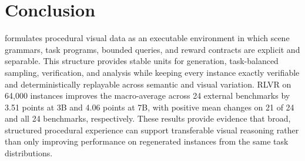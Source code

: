 \section{Conclusion}
\label{sec:conclusion}

\trace formulates procedural visual data as an executable environment in which
scene grammars, task programs, bounded queries, and reward contracts are explicit
and separable. This structure provides stable units for generation, task-balanced
sampling, verification, and analysis while keeping every instance exactly
verifiable and deterministically replayable across semantic and visual variation.
RLVR on 64,000 \trace instances improves the macro-average across 24 external
benchmarks by 3.51 points at 3B and 4.06 points at 7B, with positive mean changes
on 21 of 24 and all 24 benchmarks, respectively. These results provide evidence
that broad, structured procedural experience can support transferable visual
reasoning rather than only improving performance on regenerated instances from
the same task distributions.